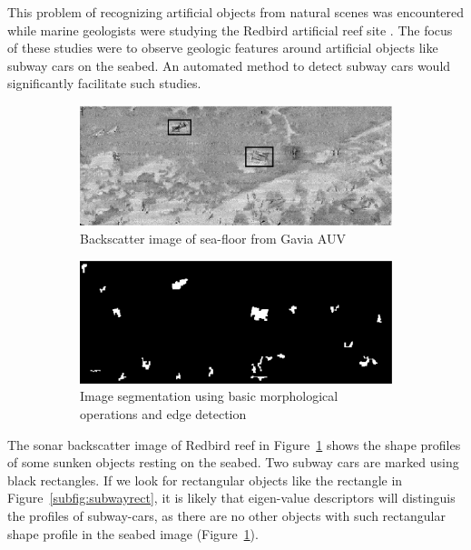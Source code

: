 \documentclass {udthesis}
\begin{document}
This problem of recognizing artificial objects from natural scenes was encountered while marine geologists were studying the Redbird artificial reef site \cite{redbird_nicole, redbird_art}. The focus of these studies were to observe geologic features around artificial objects like subway cars on the seabed. An automated method to detect subway cars would significantly facilitate such studies. 

\begin{figure}
  \begin{subfigure}[]{0.9\textwidth}
      \includegraphics[width=\textwidth]{subwayorig}
      \caption{Backscatter image of sea-floor from Gavia AUV}
      \label{subfig:subwayorig}
  \end{subfigure}
  \begin{subfigure}[]{0.9\textwidth}
      \includegraphics[width=\textwidth]{subwaysegment}
      \caption{Image segmentation using basic morphological operations and edge detection}
      \label{subfig:subwaysegment}
  \end{subfigure}
\caption{}
\end{figure}

The sonar backscatter image of Redbird reef in Figure~\ref{subfig:subwayorig} shows the shape profiles of some sunken objects resting on the seabed. Two subway cars are marked using black rectangles. If we look for rectangular objects like the rectangle in Figure~\ref{subfig:subwayrect}, it is likely that eigen-value descriptors will distinguis the profiles of subway-cars, as there are no other objects with such rectangular shape profile in the seabed image (Figure~\ref{subfig:subwayorig}). 
\end{document}
